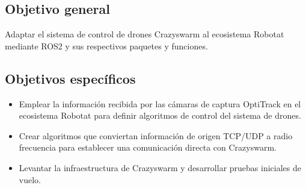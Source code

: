 \subsection*{Objetivo general}
Adaptar el sistema de control de drones Crazyswarm al ecosistema Robotat mediante ROS2 y sus respectivos paquetes y funciones.

\subsection*{Objetivos específicos}
\begin{itemize}
\item Emplear la información recibida por las cámaras de captura OptiTrack en el ecosistema Robotat para definir algoritmos de control del sistema de drones.
\item Crear algoritmos que conviertan información de origen TCP/UDP a radio frecuencia para establecer una comunicación directa con Crazyswarm.
\item Levantar la infraestructura de Crazyswarm y desarrollar pruebas iniciales de vuelo.
\end{itemize}